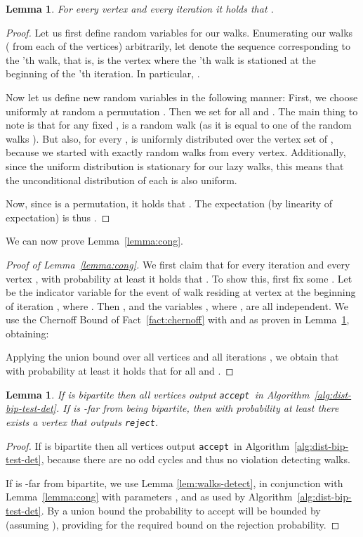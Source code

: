 \documentclass[11pt]{article}
\newtheorem{lemma}[theorem]{Lemma}
\newcommand{\accept}{\texttt{accept}}
\newcommand{\reject}{\texttt{reject}}
\begin{document}
\begin{lemma}
\label{lem:exp-walks-in-vertex}
For every vertex  and every iteration  it holds that .
\end{lemma}
\begin{proof}
Let us first define random variables for our walks.
Enumerating our  walks ( from each of the  vertices) arbitrarily, let  denote the sequence corresponding to the 'th walk, that is,  is the vertex where the 'th walk is stationed at the beginning of the 'th iteration. In particular, .

Now let us define new random variables  in the following manner: First, we choose uniformly at random a permutation . Then we set  for all  and . The main thing to note is that for any fixed ,  is a random walk (as it is equal to one of the random walks ). But also, for every ,  is uniformly distributed over the vertex set of , because we started with exactly  random walks from every vertex. Additionally, since the uniform distribution is stationary for our lazy walks, this means that the unconditional distribution of each  is also uniform.

Now, since  is a permutation, it holds that . The expectation (by linearity of expectation) is thus .
\end{proof}


We can now prove Lemma~\ref{lemma:cong}.
\begin{proof}[Proof of Lemma~\ref{lemma:cong}]
We first claim that for every iteration  and every vertex , with probability at least  it holds that .
To show this, first fix some .
Let  be the indicator variable for the event of walk  residing at vertex  at the beginning of iteration , where . Then , and the variables , where , are all independent. We use the Chernoff Bound of Fact~\ref{fact:chernoff} with  and  as proven in Lemma~\ref{lem:exp-walks-in-vertex}, obtaining:

Applying the union bound over all vertices  and all iterations , we obtain that with probability at least  it holds that  for all  and .
\end{proof}

\begin{lemma}
\label{lemma:bi-test}
If  is bipartite then all vertices output \accept ~in Algorithm~\ref{alg:dist-bip-test-det}. If  is -far from being bipartite, then with probability at least  there exists a vertex that outputs \reject.
\end{lemma}
\begin{proof}
If  is bipartite then all vertices output \accept ~in Algorithm~\ref{alg:dist-bip-test-det}, because there are no odd cycles and thus no violation detecting walks.

If  is -far from bipartite, we use Lemma \ref{lem:walks-detect}, in conjunction with Lemma~\ref{lemma:cong} with parameters ,  and  as used by Algorithm~\ref{alg:dist-bip-test-det}. By a union bound the probability to accept  will be bounded by  (assuming ), providing for the required bound on the rejection probability.
\end{proof}
\end{document}
